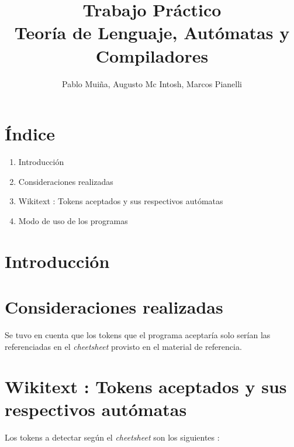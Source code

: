 \documentclass[a4paper,11pt]{article}
\title{Trabajo Pr\'actico \\ Teor\'ia de Lenguaje, Aut\'omatas y Compiladores }
\author{Pablo Mui\~na, Augusto Mc Intosh, Marcos Pianelli}
\begin{document}
\maketitle

\section{ \'Indice }

\begin{enumerate}
\item Introducci\'on
\item Consideraciones realizadas
\item Wikitext : Tokens aceptados y sus respectivos aut\'omatas
\item Modo de uso de los programas
\end{enumerate}


\section{ Introducci\'on }



\section{ Consideraciones realizadas }

Se tuvo en cuenta que los tokens que el programa aceptar\'ia solo ser\'ian las referenciadas en el \emph{cheetsheet} provisto en el material de referencia.

\section{Wikitext : Tokens aceptados y sus respectivos aut\'omatas}

Los tokens a detectar seg\'un el \emph{cheetsheet} son los siguientes :\\
\end{document}
